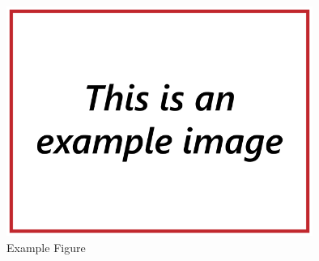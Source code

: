 \begin{figure}
\includegraphics[width=100mm,natwidth=640,natheight=480]{"./image/Example"}
\caption{\label{fig:example}Example Figure}
\end{figure}
